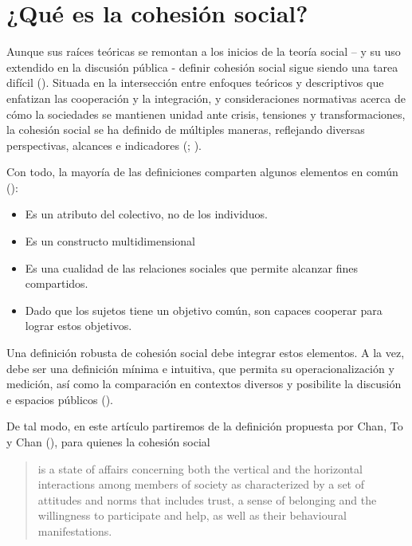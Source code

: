 \documentclass[
  spanish,
  letterpaper,
  DIV=11,
  numbers=noendperiod]{scrartcl}
\providecommand{\tightlist}{%
  \setlength{\itemsep}{0pt}\setlength{\parskip}{0pt}}
\begin{document}
\section{¿Qué es la cohesión
social?}\label{quuxe9-es-la-cohesiuxf3n-social}

Aunque sus raíces teóricas se remontan a los inicios de la teoría social
-- y su uso extendido en la discusión pública - definir cohesión social
sigue siendo una tarea difícil
(). Situada
en la intersección entre enfoques teóricos y descriptivos que enfatizan
las cooperación y la integración, y consideraciones normativas acerca de
cómo la sociedades se mantienen unidad ante crisis, tensiones y
transformaciones, la cohesión social se ha definido de múltiples
maneras, reflejando diversas perspectivas, alcances e indicadores
(;
).

Con todo, la mayoría de las definiciones comparten algunos elementos en
común ():

\begin{itemize}
\tightlist
\item
  Es un atributo del colectivo, no de los individuos.
\item
  Es un constructo multidimensional
\item
  Es una cualidad de las relaciones sociales que permite alcanzar fines
  compartidos.
\item
  Dado que los sujetos tiene un objetivo común, son capaces cooperar
  para lograr estos objetivos.
\end{itemize}

Una definición robusta de cohesión social debe integrar estos elementos.
A la vez, debe ser una definición mínima e intuitiva, que permita su
operacionalización y medición, así como la comparación en contextos
diversos y posibilite la discusión e espacios públicos
().

De tal modo, en este artículo partiremos de la definición propuesta por
Chan, To y Chan (), para
quienes la cohesión social

\begin{quote}
is a state of aﬀairs concerning both the vertical and the horizontal
interactions among members of society as characterized by a set of
attitudes and norms that includes trust, a sense of belonging and the
willingness to participate and help, as well as their behavioural
manifestations.
\end{quote}
\end{document}
